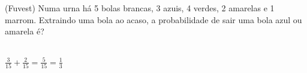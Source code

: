 \begin{ex}
(Fuvest) Numa urna há 5 bolas brancas, 3 azuis, 4 verdes, 2 amarelas e 1 marrom. Extraindo uma bola ao acaso, a probabilidade de sair uma bola azul ou amarela é?
   \begin{sol}
    \phantom{A} \\
    $\frac{3}{15}+\frac{2}{15}=\frac{5}{15}=\frac{1}{3}$
   \end{sol}
\end{ex}